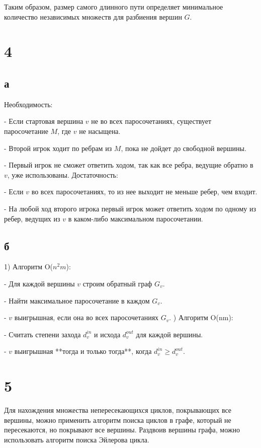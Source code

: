 \documentclass[12pt]{extarticle}
\begin{document}
Таким образом, размер самого длинного пути определяет минимальное количество независимых множеств для разбиения вершин $G$.

\section*{4}
\subsection*{а}
Необходимость:

- Если стартовая вершина $v$ не во всех паросочетаниях, существует паросочетание $M$, где $v$ не насыщена.

- Второй игрок ходит по ребрам из $M$, пока не дойдет до свободной вершины.

- Первый игрок не сможет ответить ходом, так как все ребра, ведущие обратно в $v$, уже использованы.
\newline
Достаточность:

- Если $v$ во всех паросочетаниях, то из нее выходит не меньше ребер, чем входит.

- На любой ход второго игрока первый игрок может ответить ходом по одному из ребер, ведущих из $v$ в каком-либо максимальном паросочетании.

\subsection*{б}

1) Алгоритм O($n^2 m$):

- Для каждой вершины $v$ строим обратный граф $G_v$.

- Найти максимальное паросочетание в каждом $G_v$.

- $v$ выигрышная, если она во всех паросочетаниях $G_v$.
) Алгоритм O(nm):

- Считать степени захода $d_v^{in}$ и исхода $d_v^{out}$ для каждой вершины.

- $v$ выигрышная **тогда и только тогда**, когда $d_v^{in} \ge d_v^{out}$.

\section*{5}
Для нахождения множества непересекающихся циклов, покрывающих все вершины, можно применить алгоритм поиска циклов в графе, который не пересекаются, но покрывают все вершины. Раздвоив вершины графа, можно использовать алгоритм поиска Эйлерова цикла.
\end{document}
